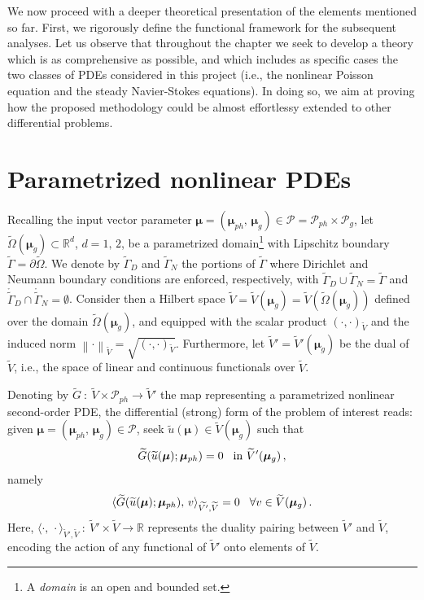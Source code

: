 \documentclass[12pt, a4paper, twoside, openright]{report}
\numberwithin{equation}{chapter}
\theoremstyle{theorem}
\theoremstyle{definition}
\theoremstyle{remark}
\theoremstyle{proposition}
\numberwithin{figure}{chapter}
\newcommand{\norm}[1]{\left\lVert#1\right\rVert}
\newcommand{\wt}[1]{\widetilde{#1}}
\newcommand{\bg}[1]{\boldsymbol{#1}}
\begin{document}
		We now proceed with a deeper theoretical presentation of the elements mentioned so far. First, we rigorously define the functional framework for the subsequent analyses. Let us observe that throughout the chapter we seek to develop a theory which is as comprehensive as possible, and which includes as specific cases the two classes of PDEs considered in this project (i.e., the nonlinear Poisson equation and the steady Navier-Stokes equations). In doing so, we aim at proving how the proposed methodology could be almost effortlessy extended to other differential problems.
		
	\vspace*{0.3cm}
		
	\section{Parametrized nonlinear PDEs}
	\label{section:Parametrized nonlinear PDEs}
	
		Recalling the input vector parameter $\bg{\mu} = (\bg{\mu}_{ph}, \, \bg{\mu}_g) \in \mathcal{P} = \mathcal{P}_{ph} \times \mathcal{P}_g$, let $\wt{\Omega}(\boldsymbol{\mu}_g) \subset \mathbb{R}^d$, $d = 1, \, 2$, be a parametrized domain\footnote{A \emph{domain} is an open and bounded set.} with Lipschitz boundary $\wt{\Gamma} = \partial \wt{\Omega}$. We denote by $\wt{\Gamma}_D$ and $\wt{\Gamma}_N$ the portions of $\wt{\Gamma}$ where Dirichlet and Neumann boundary conditions are enforced, respectively, with $\wt{\Gamma}_D \cup \wt{\Gamma}_N = \wt{\Gamma}$ and $\mathring{\wt{\Gamma}}_D \cap \mathring{\wt{\Gamma}}_N = \emptyset$. Consider then a Hilbert space $\wt{V} = \wt{V}(\bg{\mu}_g) = \wt{V}(\wt{\Omega}(\boldsymbol{\mu}_g))$ defined over the domain $\wt{\Omega}(\boldsymbol{\mu}_g)$, and equipped with the scalar product $(\cdot,\cdot)_{\wt{V}}$ and the induced norm $\norm{\cdot}_{\wt{V}} = \sqrt{(\cdot,\cdot)_{\wt{V}}}$. Furthermore, let $\wt{V}' = \wt{V}'(\boldsymbol{\mu}_g)$ be the dual of $\wt{V}$, i.e., the space of linear and continuous functionals over $\wt{V}$.
		
		Denoting by $\wt{G} ~ : ~ \wt{V} \times \mathcal{P}_{ph} \rightarrow \wt{V}'$ the map representing a parametrized nonlinear second-order PDE, the differential (strong) form of the problem of interest reads: given $\bg{\mu} = (\bg{\mu}_{ph}, \, \bg{\mu}_g) \in \mathcal{P}$, seek $\wt{u}(\boldsymbol{\mu}) \in \wt{V}(\bg{\mu}_g)$ such that
		\begin{equation}
			\label{eq:pde-differential-form}
			\wt{G}(\wt{u}(\bg{\mu}); \bg{\mu}_{ph}) = 0 \hspace*{0.3cm} \text{in $\wt{V}'(\bg{\mu}_g)$} \, ,
		\end{equation}
		namely
		\begin{equation*}
			\langle \wt{G}(\wt{u}(\bg{\mu}); \bg{\mu}_{ph}), \, v \rangle_{\wt{V'},\wt{V}} = 0 \hspace*{0.3cm} \forall v \in \wt{V}(\bg{\mu}_g) \, .
		\end{equation*}
		Here, $\langle \cdot, \, \cdot \rangle_{\wt{V}',\wt{V}} ~ : ~ \wt{V}' \times \wt{V} \rightarrow \mathbb{R}$ represents the duality pairing between $\wt{V}'$ and $\wt{V}$, encoding the action of any functional of $\wt{V}'$ onto elements of $\wt{V}$.
		
\end{document}
